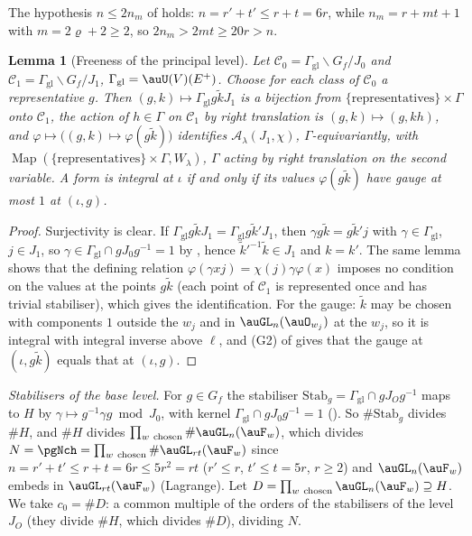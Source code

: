 \documentclass[10pt]{amsart}
\newtheorem{lemma}[theorem]{Lemma}
\theoremstyle{definition}
\theoremstyle{remark}
\begin{document}
The hypothesis $n\le2n_m$ of {\cite[Lemma~14.5]{P46}} holds: $n=r'+t'\le r+t=6r$, while
$n_m=r+mt+1$ with $m=2\varrho+2\ge2$, so $2n_m>2mt\ge20r>n$.

\begin{lemma}[Freeness of the principal level]\label{pax:free}
Let $\mathcal C_0=\Gamma_{\mathrm{gl}}\backslash G_f/J_0$ and $\mathcal C_1=
\Gamma_{\mathrm{gl}}\backslash G_f/J_1$, $\Gamma_{\mathrm{gl}}=\auU(V)(E^+)$. Choose for each class of
$\mathcal C_0$ a representative $g$. Then $(g,k)\mapsto\Gamma_{\mathrm{gl}}g\tilde kJ_1$ is a bijection
from $\{\text{representatives}\}\times\Gamma$ onto $\mathcal C_1$, the action of $h\in\Gamma$ on
$\mathcal C_1$ by right translation is $(g,k)\mapsto(g,kh)$, and $\varphi\mapsto\bigl((g,k)\mapsto
\varphi(g\tilde k)\bigr)$ identifies $\mathcal A_\lambda(J_1,\chi)$, $\Gamma$-equivariantly, with
$\operatorname{Map}(\{\text{representatives}\}\times\Gamma,W_\lambda)$, $\Gamma$ acting by right
translation on the second variable. A form is integral at $\iota$ if and only if its values
$\varphi(g\tilde k)$ have gauge at most $1$ at $(\iota,g)$.
\end{lemma}

\begin{proof}
Surjectivity is clear. If $\Gamma_{\mathrm{gl}}g\tilde kJ_1=\Gamma_{\mathrm{gl}}g\tilde k'J_1$, then
$\gamma g\tilde k=g\tilde k'j$ with $\gamma\in\Gamma_{\mathrm{gl}}$, $j\in J_1$, so $\gamma\in\Gamma_{
\mathrm{gl}}\cap gJ_0g^{-1}=1$ by {\cite[Lemma~14.5]{P46}}, hence $\tilde k'^{-1}\tilde k\in J_1$ and $k=k'$.
The same lemma shows that the defining relation $\varphi(\gamma xj)=\chi(j)\gamma\varphi(x)$ imposes
no condition on the values at the points $g\tilde k$ (each point of $\mathcal C_1$ is represented once
and has trivial stabiliser), which gives the identification. For the gauge: $\tilde k$ may be chosen
with components $1$ outside the $w_j$ and in $\auGL_n(\auO_{w_j})$ at the $w_j$, so it is integral
with integral inverse above $\ell$, and (G2) of {\cite[\S6.1]{P49}} gives that the gauge at
$(\iota,g\tilde k)$ equals that at $(\iota,g)$.
\end{proof}

\emph{Stabilisers of the base level.} For $g\in G_f$ the stabiliser $\mathrm{Stab}_g=\Gamma_{\mathrm{gl}}
\cap gJ_Og^{-1}$ maps to $H$ by $\gamma\mapsto g^{-1}\gamma g\bmod J_0$, with kernel $\Gamma_{\mathrm{gl}}
\cap gJ_0g^{-1}=1$ ({\cite[Lemma~14.5]{P46}}). So $\#\mathrm{Stab}_g$ divides $\#H$, and $\#H$ divides
$\prod_{w\ \mathrm{chosen}}\#\auGL_n(\auF_w)$, which divides $N=\pgNch=\prod_{w\ \mathrm{chosen}}
\#\auGL_{rt}(\auF_w)$ since $n=r'+t'\le r+t=6r\le5r^2=rt$ ($r'\le r$, $t'\le t=5r$, $r\ge2$) and $\auGL_n(\auF_w)$ embeds in $\auGL_{rt}(\auF_w)$
(Lagrange). Let $D=\prod_{w\ \mathrm{chosen}}\auGL_n(\auF_w)\supseteq H$. We take $c_0=\#D$: a common multiple of the orders of the stabilisers of the level $J_O$
(they divide $\#H$, which divides $\#D$), dividing $N$.
\end{document}
